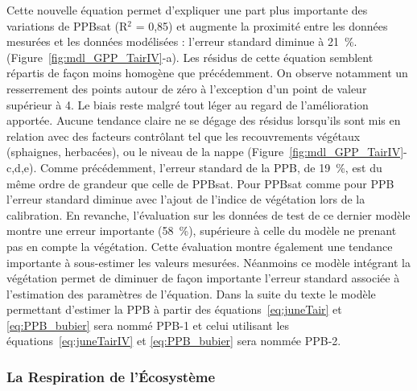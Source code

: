 Cette nouvelle équation permet d'expliquer une part plus importante des variations de PPBsat (R$^{2}$ = 0,85) et augmente la proximité entre les données mesurées et les données modélisées : l'erreur standard diminue à \SI{21}{\percent}. (Figure~\ref{fig:mdl_GPP_TairIV}-a).
Les résidus de cette équation semblent répartis de façon moins homogène que précédemment.
On observe notamment un resserrement des points autour de zéro à l'exception d'un point de valeur supérieur à \num{4}.
Le biais reste malgré tout léger au regard de l'amélioration apportée.
Aucune tendance claire ne se dégage des résidus lorsqu'ils sont mis en relation avec des facteurs contrôlant tel que les recouvrements végétaux (sphaignes, herbacées), ou le niveau de la nappe (Figure~\ref{fig:mdl_GPP_TairIV}-c,d,e).
Comme précédemment, l'erreur standard de la PPB, de \SI{19}{\percent}, est du même ordre de grandeur que celle de PPBsat.
Pour PPBsat comme pour PPB l'erreur standard diminue avec l'ajout de l'indice de végétation lors de la calibration.
En revanche, l'évaluation sur les données de test de ce dernier modèle montre une erreur importante (\SI{58}{\percent}), supérieure à celle du modèle ne prenant pas en compte la végétation.
Cette évaluation montre également une tendance importante à sous-estimer les valeurs mesurées.
Néanmoins ce modèle intégrant la végétation permet de diminuer de façon importante l'erreur standard associée à l'estimation des paramètres de l'équation.
Dans la suite du texte le modèle permettant d'estimer la PPB à partir des équations~\ref{eq:juneTair} et \ref{eq:PPB_bubier} sera nommé PPB-1 et celui utilisant les équations~\ref{eq:juneTairIV} et \ref{eq:PPB_bubier} sera nommée PPB-2.




\subsubsection{La Respiration de l'Écosystème}


